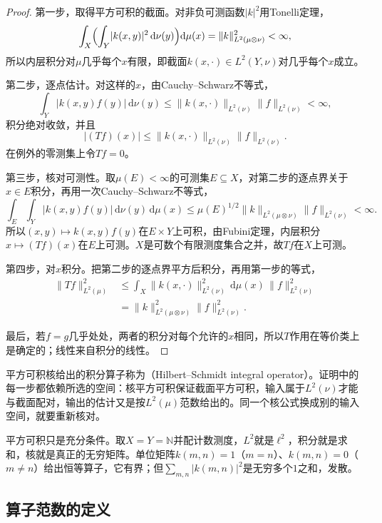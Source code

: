 \begin{proof}
第一步，取得平方可积的截面。对非负可测函数$\lvert k\rvert^2$用Tonelli定理，
\[
 \int_X\Bigl(\int_Y\lvert k(x,y)\rvert^2\,\mathrm d\nu(y)\Bigr)\mathrm d\mu(x)=\lVert k\rVert_{L^2(\mu\otimes\nu)}^2<\infty ,
\]
所以内层积分对$\mu$几乎每个$x$有限，即截面$k(x,\cdot)\in L^2(Y,\nu)$对几乎每个$x$成立。

第二步，逐点估计。对这样的$x$，由Cauchy--Schwarz不等式，
\[
 \int_Y\lvert k(x,y)f(y)\rvert\,\mathrm d\nu(y)\leq\lVert k(x,\cdot)\rVert_{L^2(\nu)}\lVert f\rVert_{L^2(\nu)}<\infty ,
\]
积分绝对收敛，并且
\[
 \lvert(Tf)(x)\rvert\leq\lVert k(x,\cdot)\rVert_{L^2(\nu)}\lVert f\rVert_{L^2(\nu)}.
\]
在例外的零测集上令$Tf=0$。

第三步，核对可测性。取$\mu(E)<\infty$的可测集$E\subseteq X$，对第二步的逐点界关于$x\in E$积分，再用一次Cauchy--Schwarz不等式，
\[
 \int_E\int_Y\lvert k(x,y)f(y)\rvert\,\mathrm d\nu(y)\,\mathrm d\mu(x)
 \leq\mu(E)^{1/2}\lVert k\rVert_{L^2(\mu\otimes\nu)}\lVert f\rVert_{L^2(\nu)}<\infty .
\]
所以$(x,y)\mapsto k(x,y)f(y)$在$E\times Y$上可积，由Fubini定理，内层积分$x\mapsto(Tf)(x)$在$E$上可测。$X$是可数个有限测度集合之并，故$Tf$在$X$上可测。

第四步，对$x$积分。把第二步的逐点界平方后积分，再用第一步的等式，
\[
 \begin{aligned}
 \lVert Tf\rVert_{L^2(\mu)}^2
 &\leq\int_X\lVert k(x,\cdot)\rVert_{L^2(\nu)}^2\,\mathrm d\mu(x)\,\lVert f\rVert_{L^2(\nu)}^2\\
 &=\lVert k\rVert_{L^2(\mu\otimes\nu)}^2\lVert f\rVert_{L^2(\nu)}^2 .
 \end{aligned}
\]

最后，若$f=g$几乎处处，两者的积分对每个允许的$x$相同，所以$T$作用在等价类上是确定的；线性来自积分的线性。
\end{proof}

平方可积核给出的积分算子称为（Hilbert--Schmidt integral operator）。证明中的每一步都依赖所选的空间：核平方可积保证截面平方可积，输入属于$L^2(\nu)$才能与截面配对，输出的估计又是按$L^2(\mu)$范数给出的。同一个核公式换成别的输入空间，就要重新核对。

平方可积只是充分条件。取$X=Y=\mathbb N$并配计数测度，$L^2$就是$\ell^2$，积分就是求和，核就是真正的无穷矩阵。单位矩阵$k(m,n)=1$（$m=n$）、$k(m,n)=0$（$m\neq n$）给出恒等算子，它有界；但$\sum_{m,n}\lvert k(m,n)\rvert^2$是无穷多个$1$之和，发散。

\subsection{算子范数的定义}
\label{sec:lop-norm-definition}

